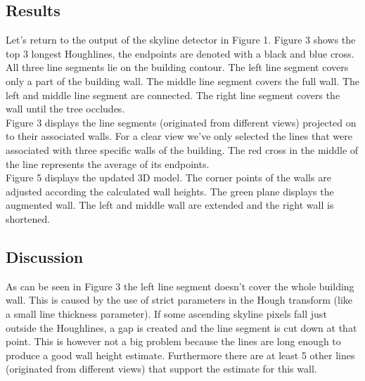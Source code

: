 \subsection{Results}
\noindent
{}
Let's return to the output of the skyline detector in Figure 1.
Figure 3
shows the top 3 longest Houghlines, the
endpoints are denoted with a black and blue cross. All three line segments lie on the
building contour.  The left line segment covers only a part of the building wall. The
middle line segment covers the full wall. The left and middle line segment are connected. The
right line segment covers the wall until the tree occludes.\\
Figure %
3 displays the line segments (originated from
different views) projected on to their associated walls.  For a clear view we've
only selected the lines that were associated with three specific walls of the building.  
The red cross in the middle of the line represents the average of its endpoints.\\
Figure 5 %
displays the updated 3D model. The
corner points of the walls are adjusted according the calculated wall heights.
The green plane displays the augmented wall. The left and middle wall are extended
and the right wall is shortened.\\


\subsection{Discussion}
As can be seen in Figure
3 the left line segment doesn't cover the whole
building wall. This is caused by the use of strict parameters in the Hough transform
(like a small line thickness parameter).  If some ascending skyline pixels fall just outside
the Houghlines, a gap is created and the line segment is cut down at that point.
This is however not a big problem because the lines are long enough to produce a
good wall height estimate. Furthermore there are at least 5 other lines
(originated from different views) that support the estimate for this wall.\\



